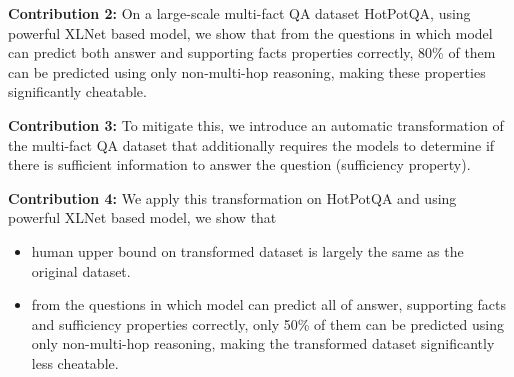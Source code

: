 \eat{
        
}


\noindent \textbf{Contribution 2:} On a large-scale multi-fact QA dataset HotPotQA, using powerful XLNet based model, we show that from the questions in which model can predict both answer and supporting facts properties correctly, 80\% of them can be predicted using only non-multi-hop reasoning, making these properties significantly cheatable.


\noindent \textbf{Contribution 3:} To mitigate this, we introduce an automatic transformation of the multi-fact QA dataset that additionally requires the models to determine if there is sufficient information to answer the question (sufficiency property).


\noindent \textbf{Contribution 4:} We apply this transformation on HotPotQA and using powerful XLNet based model, we show that 
\begin{itemize}
    \item human upper bound on transformed dataset is largely the same as the original dataset.
    \item from the questions in which model can predict all of answer,  supporting facts and sufficiency properties correctly, only 50\% of them can be predicted using only non-multi-hop reasoning, making the transformed dataset significantly less cheatable.
\end{itemize}


